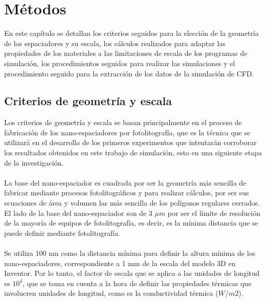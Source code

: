 \chapter{Métodos}\label{chapter:Metodos}
En este capítulo se detallan los criterios seguidos para la elección de la geometría de los espaciadores y su escala, los cálculos realizados para adaptar las propiedades de los materiales a las limitaciones de escala de los programas de simulación, los procedimientos seguidos para realizar las simulaciones y el procedimiento seguido para la extracción de los datos de la simulación de CFD.
\section{Criterios de geometría y escala}
Los criterios de geometría y escala se basan principalmente en el proceso de fabricación de los nano-espaciadores por fotolitografía, que es la técnica que se utilizará en el desarrollo de los primeros experimentos que intentarán corroborar los resultados obtenidos en este trabajo de simulación, esto en una siguiente etapa de la investigación.\\\\
La base del nano-espaciador es cuadrada por ser la geometría más sencilla de fabricar mediante procesos fotolitográficos y para realizar cálculos, por ser sus ecuaciones de área y volumen las más sencilla de los polígonos regulares cerrados. El lado de la base del nano-espaciador son de 3 $\mu m$ por ser el límite de resolución de la mayoría de equipos de fotolitografía, es decir, es la mínima distancia que se puede definir mediante fotolitografía.\\\\
Se utiliza 100 nm como la distancia mínima para definir la altura mínima de los nano-espaciadores, correspondiente a 1 mm de la escala del modelo 3D en Inventor. Por lo tanto, el factor de escala que se aplica a las unidades de longitud es $10^4$, que se toma en cuenta a la hora de definir las propiedades térmicas que involucren unidades de longitud, como es la conductividad térmica ($W/m2$).
